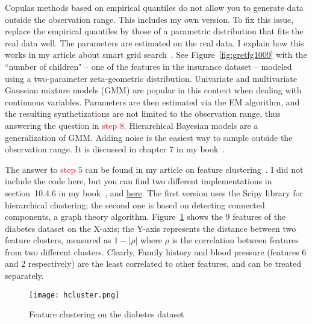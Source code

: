 \documentclass[oneside,10pt]{book}
\begin{document}
Copulas methods based on \textcolor{index}{empirical quantiles} do not allow you to generate data outside the observation range. This includes my own version.
To fix this issue, replace the empirical quantiles by those of a parametric distribution that fits the real data well. The parameters are estimated 
 on the real data. I explain how this works in my article about smart grid search~\cite{vgsmart}. See Figure~\ref{fig:gretfg1009} with 
 the ``number of children" -- one of the features in the insurance dataset -- modeled using a two-parameter zeta-geometric distribution.
 Univariate and multivariate \textcolor{index}{Gaussian mixture models}  (GMM) are popular in this context when dealing with continuous variables. Parameters are then estimated
 via the \textcolor{index}{EM algorithm}, and the resulting synthetizations are not limited to the observation range, thus answering the question in \textcolor{red}{step 8}. Hierarchical Bayesian models are a generalization of GMM.
 Adding noise is the easiest way to sample outside the observation range. It is discussed in chapter 7 in my book~\cite{vgelsevier}.

The answer to \textcolor{red}{step 5} can be found in my article on feature clustering~\cite{vgfclust}. I did not include the code here, but you can find two 
 different implementations in section~10.4.6 in my book~\cite{vgelsevier}, and 
\href{https://github.com/VincentGranville/Main/blob/main/featureClusteringScipy.py}{here}. The first version uses the 
\textcolor{index}{Scipy} library for 
\textcolor{index}{hierarchical clustering}; the second one is based on detecting \textcolor{index}{connected components}, a graph theory algorithm. Figure~\ref{fig:gretde3bn} shows the 9 features of the diabetes dataset on the X-axis; the Y-axis represents the distance between two feature clusters, measured as $1-|\rho|$ where $\rho$ is the correlation between features from two different clusters. Clearly, Family history and blood pressure (features 6 and 2 respectively) are the least correlated to other features, and can be treated separately.

\begin{figure}[H]
\centering
\texttt{[image: hcluster.png]}   
\caption{Feature clustering on the diabetes dataset}
\label{fig:gretde3bn}
\end{figure}
\end{document}
